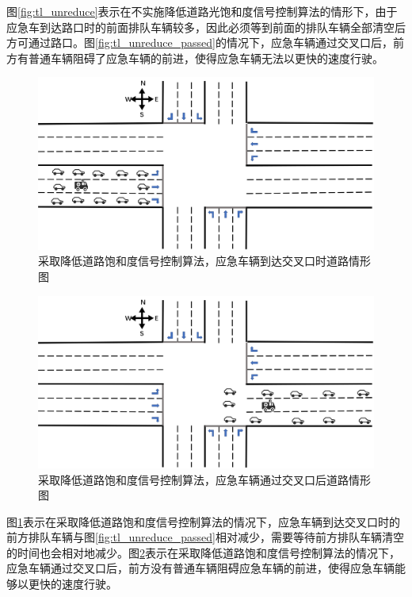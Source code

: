 图\ref{fig:tl_unreduce}表示在不实施降低道路光饱和度信号控制算法的情形下，由于应急车到达路口时的前面排队车辆较多，因此必须等到前面的排队车辆全部清空后方可通过路口。图\ref{fig:tl_unreduce_passed}的情况下，应急车辆通过交叉口后，前方有普通车辆阻碍了应急车辆的前进，使得应急车辆无法以更快的速度行驶。

\begin{figure}[H]
	\centering
	\includegraphics[width=\textwidth]{figures/tl_reduce.png}
	\caption{采取降低道路饱和度信号控制算法，应急车辆到达交叉口时道路情形图}
	\label{fig:tl_reduce}
\end{figure}

\begin{figure}[H]
	\centering
	\includegraphics[width=\textwidth]{figures/tl_reduce_passed.png}
	\caption{采取降低道路饱和度信号控制算法，应急车辆通过交叉口后道路情形图}
	\label{fig:tl_reduce_passed}
\end{figure}

图\ref{fig:tl_reduce}表示在采取降低道路饱和度信号控制算法的情况下，应急车辆到达交叉口时的前方排队车辆与图\ref{fig:tl_unreduce_passed}相对减少，需要等待前方排队车辆清空的时间也会相对地减少。图\ref{fig:tl_reduce_passed}表示在采取降低道路饱和度信号控制算法的情况下，应急车辆通过交叉口后，前方没有普通车辆阻碍应急车辆的前进，使得应急车辆能够以更快的速度行驶。

